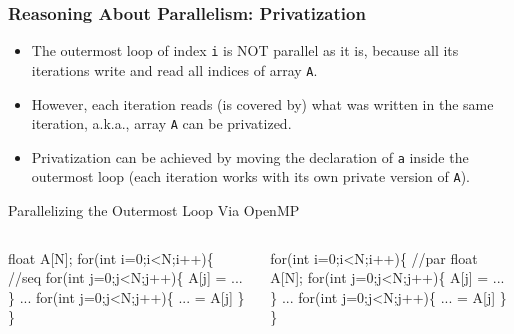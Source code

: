 \documentclass{beamer}
\newcommand{\emp}[1]{\textcolor{DikuRed}{ #1}}
\newcommand{\emphh}[1]{\textcolor{CosGreen}{ #1}}
\begin{document}
\begin{frame}[fragile,t]
  \frametitle{Reasoning About Parallelism: Privatization} %


\begin{itemize}
\item The outermost loop of index {\tt i} is NOT parallel as it is,
because all its iterations write and read all indices of
array {\tt A}.\smallskip

\item However, each iteration reads (is covered by) what was 
written in the same iteration, a.k.a., array {\tt A} can be privatized.

\item Privatization can be achieved by moving the
declaration of {\tt a} inside the outermost loop
(each iteration works with its own private version of {\tt A}).
\end{itemize}

\begin{block}{Parallelizing the Outermost Loop Via OpenMP}
\begin{columns}
\begin{colorcode}
float A[N];
\emp{for(int i=0;i<N;i++)\{ //seq}
  for(int j=0;j<N;j++)\{
    A[j] = ...
  \}
  ...
  for(int j=0;j<N;j++)\{
    ... = A[j]
  \}  
\}
\end{colorcode}
\begin{colorcode}
\emphh{for(int i=0;i<N;i++)\{ //par}
  float A[N];
  for(int j=0;j<N;j++)\{
    A[j] = ...
  \}
  ...
  for(int j=0;j<N;j++)\{
    ... = A[j]
  \}  
\}
\end{colorcode}
\end{columns}
\end{block} 

\end{frame}
\end{document}
